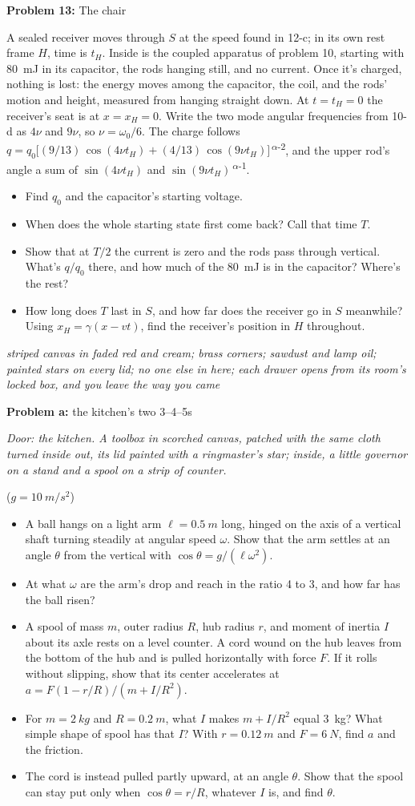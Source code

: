 \documentclass[11pt]{article}
\newcommand{\scene}[1]{\par{\itshape #1}\par}
\newcommand{\problem}[2]{\par\medskip\textbf{Problem #1:} #2\par\nopagebreak}
\newcommand{\appx}[2]{\clearpage{\Large\bfseries Appendix #1: #2}\par\medskip}
\newenvironment{parts}{\begin{itemize}[leftmargin=3.4em,labelwidth=2.8em,labelsep=0.6em,align=left,itemsep=2pt,topsep=3pt]}{\end{itemize}}
\newcommand{\pt}[1]{\item[\textbf{#1}]}
\newcommand{\sv}[1]{\textsuperscript{\dag\,#1}}
\begin{document}
\problem{13}{The chair}
A sealed receiver moves through $S$ at the speed found in 12-c; in its own rest frame $H$, time is $t_H$. Inside is the coupled apparatus of problem 10, starting with \SI{80}{mJ} in its capacitor, the rods hanging still, and no current. Once it's charged, nothing is lost: the energy moves among the capacitor, the coil, and the rods' motion and height, measured from hanging straight down. At $t = t_H = 0$ the receiver's seat is at $x = x_H = 0$. Write the two mode angular frequencies from 10-d as $4\nu$ and $9\nu$, so $\nu = \omega_0/6$. The charge follows $q = q_0\bigl[(9/13)\,\cos(4\nu t_H) + (4/13)\,\cos(9\nu t_H)\bigr]$\sv{$\alpha$-2}, and the upper rod's angle a sum of $\sin(4\nu t_H)$ and $\sin(9\nu t_H)$\sv{$\alpha$-1}.
\begin{parts}
\pt{13-a} Find $q_0$ and the capacitor's starting voltage.
\pt{13-b} When does the whole starting state first come back? Call that time $T$.
\pt{13-c} Show that at $T/2$ the current is zero and the rods pass through vertical. What's $q/q_0$ there, and how much of the \SI{80}{mJ} is in the capacitor? Where's the rest?
\pt{13-d} How long does $T$ last in $S$, and how far does the receiver go in $S$ meanwhile? Using $x_H = \gamma(x - vt)$, find the receiver's position in $H$ throughout.
\end{parts}

\appx{a}{the cabinet}
\scene{striped canvas in faded red and cream; brass corners; sawdust and lamp oil; painted stars on every lid; no one else in here; each drawer opens from its room's locked box, and you leave the way you came}

\problem{a}{the kitchen's two 3--4--5s}
\scene{Door: the kitchen. A toolbox in scorched canvas, patched with the same cloth turned inside out, its lid painted with a ringmaster's star; inside, a little governor on a stand and a spool on a strip of counter.}
($g = \SI{10}{m/s^2}$)
\begin{parts}
\pt{a-1} A ball hangs on a light arm $\ell = \SI{0.5}{m}$ long, hinged on the axis of a vertical shaft turning steadily at angular speed $\omega$. Show that the arm settles at an angle $\theta$ from the vertical with $\cos\theta = g/(\ell\omega^2)$.
\pt{a-2} At what $\omega$ are the arm's drop and reach in the ratio 4 to 3, and how far has the ball risen?
\pt{a-3} A spool of mass $m$, outer radius $R$, hub radius $r$, and moment of inertia $I$ about its axle rests on a level counter. A cord wound on the hub leaves from the bottom of the hub and is pulled horizontally with force $F$. If it rolls without slipping, show that its center accelerates at $a = F(1 - r/R)/(m + I/R^2)$.
\pt{a-4} For $m = \SI{2}{kg}$ and $R = \SI{0.2}{m}$, what $I$ makes $m + I/R^2$ equal \SI{3}{kg}? What simple shape of spool has that $I$? With $r = \SI{0.12}{m}$ and $F = \SI{6}{N}$, find $a$ and the friction.
\pt{a-5} The cord is instead pulled partly upward, at an angle $\theta$. Show that the spool can stay put only when $\cos\theta = r/R$, whatever $I$ is, and find $\theta$.
\end{parts}
\end{document}
